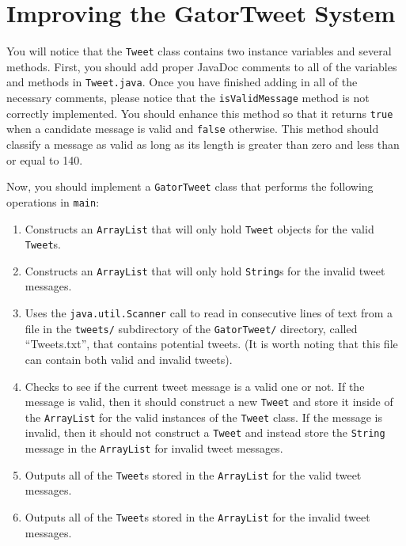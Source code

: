 \section*{Improving the GatorTweet System}

  You will notice that the {\tt Tweet} class contains two instance variables and several methods.  First, you should add
  proper JavaDoc comments to all of the variables and methods in {\tt Tweet.java}.  Once you have finished adding in all
  of the necessary comments, please notice that the {\tt isValidMessage} method is not correctly implemented.  You
  should enhance this method so that it returns {\tt true} when a candidate message is valid and {\tt false} otherwise.
  This method should classify a message as valid as long as its length is greater than zero and less than or equal to
  140.


Now, you should implement a {\tt GatorTweet} class that performs the following operations in {\tt main}:

\vspace*{-.1in} \begin{enumerate}
    \item Constructs an {\tt ArrayList} that will only hold {\tt Tweet} objects for the valid {\tt Tweet}s.

    \item Constructs an {\tt ArrayList} that will only hold {\tt String}s for the invalid tweet messages.

    \item Uses the {\tt java.util.Scanner} call to read in consecutive lines of text from a file in the {\tt tweets/}
      subdirectory of the {\tt GatorTweet/} directory, called ``Tweets.txt'', that contains potential tweets. (It is
      worth noting that this file can contain both valid and invalid tweets).

    \item Checks to see if the current tweet message is a valid one or not.  If the message is valid, then it should
      construct a new {\tt Tweet} and store it inside of the {\tt ArrayList} for the valid instances of the {\tt Tweet}
      class.  If the message is invalid, then it should not construct a {\tt Tweet} and instead store the {\tt String}
      message in the {\tt ArrayList} for invalid tweet messages.

    \item Outputs all of the {\tt Tweet}s stored in the {\tt ArrayList} for the valid tweet messages. 

    \item Outputs all of the {\tt Tweet}s stored in the {\tt ArrayList} for the invalid tweet messages. 

  \end{enumerate}

